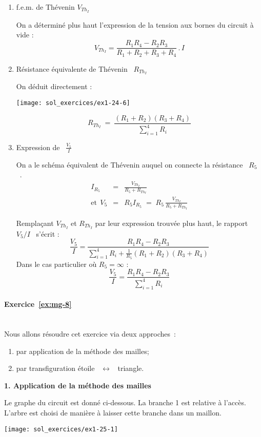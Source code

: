 \begin{enumerate}
\item  f.e.m. de Thévenin  $V_{{Th}_I}$

On a déterminé plus haut l'expression de la tension aux bornes du circuit à vide :
\[V_{{Th}_I}= \dfrac{R_1R_4 -R_2R_3}{R_1+R_2+R_3+R_4} \, . \, I \]

\item Résistance équivalente de Thévenin \ $R_{{Th}_I}$

On déduit directement  : 
\begin{center} 
	\texttt{[image: sol\_exercices/ex1-24-6]}
\end{center} 
\[ R_{{Th}_I} \: = \: \frac{(R_1+R_2)(R_3+R_4)}{\sum^4_{i=1} R_i} \] 

\item  Expression de \ $\frac{V_5}{I}$

On a le schéma équivalent de Thévenin auquel on connecte la résistance \ $R_5$~.
\begin{eqnarray*} 
	I_{R_5} &=& \frac{V_{{Th}_I}}{R_5+R_{{Th}_I}} \\ 
	\mbox{et}~~V_5 &=& R_5
	I_{R_5} \; = \; R_5 \, \frac{V_{{Th}_I}}{R_5+R_{{Th}_I}} 
\end{eqnarray*}	

Remplaçant $V_{{Th}_I}$ et $R_{{Th}_I}$ par leur expression trouvée plus haut, le rapport \ $V_5/I$ \ s'écrit :
\[\frac{V_5}{I}=\frac{R_1R_4-R_2R_3}{\sum_{i=1}^4R_i+\frac{1}{R_5} (R_1+R_2)(R_3+R_4)}\]
Dans le cas particulier où $R_5=\infty$ :
\[\frac{V_5}{I}=\frac{R_1R_4-R_2R_3}{\sum_{i=1}^4R_i}\]
	
\end{enumerate}
\paragraph{Exercice~\ref{ex:mg-8}}~\\%
Nous allons résoudre cet exercice via deux approches~:
\begin{enumerate}
	\item par application de la méthode des mailles;
	\item par transfiguration étoile \ $\leftrightarrow$ \ triangle.
\end{enumerate}

{\bf 1. Application de la méthode des mailles}

Le graphe du circuit est donné ci-dessous.
La branche 1 est relative à l'accès. L'arbre est choisi de manière à
laisser cette branche dans un maillon.
\begin{center}
	\texttt{[image: sol\_exercices/ex1-25-1]}
\end{center}

